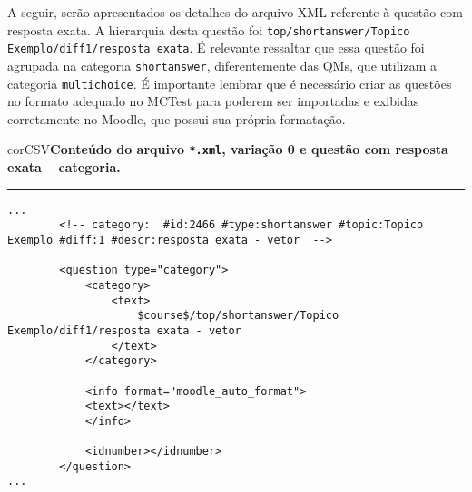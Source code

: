 A seguir, serão apresentados os detalhes do arquivo XML referente à questão com resposta exata. A hierarquia desta questão foi \verb|top/shortanswer/Topico Exemplo/diff1/resposta exata|. É relevante ressaltar que essa questão foi agrupada na categoria \verb|shortanswer|, diferentemente das QMs, que utilizam a categoria \verb|multichoice|. É importante lembrar que é necessário criar as questões no formato adequado no MCTest para poderem ser importadas e exibidas corretamente no Moodle, que possui sua própria formatação.

\begin{myboxCode}{corCSV}{\textbf{Conteúdo do arquivo \texttt{*.xml}, variação 0 e questão com resposta exata -- categoria.}}\vspace{3mm}
\hrule
{\scriptsize
\begin{verbatim}
...
        <!-- category:  #id:2466 #type:shortanswer #topic:Topico Exemplo #diff:1 #descr:resposta exata - vetor  -->
        
        <question type="category">
            <category>
                <text>
                    $course$/top/shortanswer/Topico Exemplo/diff1/resposta exata - vetor
                </text>
            </category>
            
            <info format="moodle_auto_format">
            <text></text>
            </info>
            
            <idnumber></idnumber>
        </question>
...
\end{verbatim}
}
\end{myboxCode}

